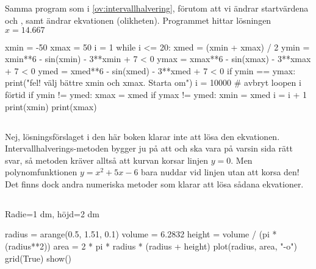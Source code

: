 \subsection*{}
Samma program som i \autoref{ov:intervallhalvering}, förutom att vi ändrar startvärdena  och , samt ändrar ekvationen (olikheten). Programmet hittar lösningen $x = 14.667$
\vspace{10pt}
\begin{python}
xmin = -50
xmax = 50
i = 1
while i <= 20:
	xmed = (xmin + xmax) / 2
	ymin = xmin**6 - sin(xmin) - 3**xmin + 7 < 0
	ymax = xmax**6 - sin(xmax) - 3**xmax + 7 < 0
	ymed = xmed**6 - sin(xmed) - 3**xmed + 7 < 0
	if ymin == ymax:
		print("fel! välj bättre xmin och xmax. Starta om")
		i = 10000 # avbryt loopen i förtid
	if ymin != ymed:
		xmax = xmed
	if ymax != ymed:
		xmin = xmed
	i = i + 1
print(xmin)
print(xmax)
\end{python}

\subsection*{}
Nej, lösningsförslaget i den här boken klarar inte att lösa den ekvationen. Intervallhalverings-metoden bygger ju på att  och  ska vara på varsin sida rätt svar, så metoden kräver alltså att kurvan korsar linjen $y=0$. Men polynomfunktionen $y = x^2 + 5x - 6$ bara nuddar vid linjen utan att korsa den! Det finns dock andra numeriska metoder som klarar att lösa sådana ekvationer.


\subsection*{}
Radie=1 dm, höjd=2 dm
\vspace{10pt}
\begin{python}
radius = arange(0.5, 1.51, 0.1)
volume = 6.2832
height = volume / (pi * (radius**2))
area = 2 * pi * radius * (radius + height)
plot(radius, area, "-o")
grid(True)
show()
\end{python}



